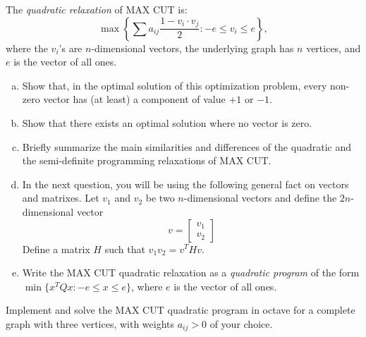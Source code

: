 \documentclass[fleqn]{homework}
\begin{document}
  \begin{problem}{3}
    \begin{question}
      The \textit{quadratic relaxation} of MAX CUT is:
      \begin{equation*}
        \max \left\{\sum a_{ij} \frac{1 - v_i \cdot v_j}{2}: -e \le v_i \le e\right\},
      \end{equation*}
      where the $v_i$'s are $n$-dimensional vectors, the underlying graph has
      $n$ vertices, and $e$ is the vector of all ones.
      \begin{enumerate}[a.]
      \item Show that, in the optimal solution of this optimization problem,
        every non-zero vector has (at least) a component of value $+1$ or $-1$.
      \item Show that there exists an optimal solution where no vector is zero.
      \item Briefly summarize the main similarities and differences of the
        quadratic and the semi-definite programming relaxations of MAX CUT.
      \item In the next question, you will be using the following general fact
        on vectors and matrixes. Let $v_1$ and $v_2$ be two $n$-dimensional
        vectors and define the $2n$-dimensional vector
        \begin{equation*}
          v = \begin{bmatrix*} v_1 \\ v_2 \end{bmatrix*}
        \end{equation*}
        Define a matrix $H$ such that $v_1 v_2 = v^T H v$.
      \item Write the MAX CUT quadratic relaxation as a \textit{quadratic
          program} of the form $\min\{x^TQx: -e \le x \le e \}$, where $e$ is
        the vector of all ones.
      \end{enumerate}
    \end{question}
  \end{problem}

  \begin{problem}{3}
    \begin{question}
      Implement and solve the MAX CUT quadratic program in octave for a complete
      graph with three vertices, with weights $a_{ij} > 0$ of your choice.
    \end{question}
  \end{problem}
\end{document}

